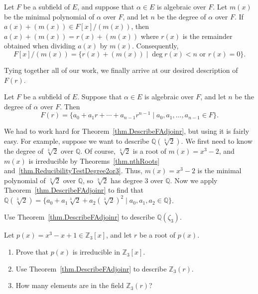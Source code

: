 \begin{lemma}\label{lem.DescribeQuotientWithRemainders}
Let $F$ be a subfield of $E$, and suppose that $\alpha\in E$ is algebraic over $F$. Let $m(x)$ be the minimal polynomial of $\alpha$ over $F$, and let $n$ be the degree of $\alpha$ over $F$.  If $a(x) + (m(x)) \in F[x]/(m(x))$, then $a(x) + (m(x)) =  r(x) + (m(x))$ where $r(x)$ is the remainder obtained when dividing $a(x)$ by $m(x)$. Consequently,
\[F[x]/(m(x)) = \{r(x) +  (m(x)) \mid \deg r(x) < n \text{ or } r(x) = 0\}.\]
\end{lemma}

Tying together all of our work, we finally arrive at our desired description of $F(r)$.

\begin{theorem}\label{thm.DescribeFAdjoinr}
Let $F$ be a subfield of $E$. Suppose that $\alpha\in E$ is algebraic over $F$, and let $n$ be the degree of $\alpha$ over $F$. Then \[F(r) = \{a_0 + a_1r+\cdots+a_{n-1}r^{n-1} \mid a_0,a_1,\ldots,a_{n-1} \in F\}.\]
\end{theorem}

We had to work hard for Theorem~\ref{thm.DescribeFAdjoinr}, but using it is fairly easy. For example, suppose we want to describe $\mathbb{Q}(\sqrt[3]{2})$. We first need to know the degree of $\sqrt[3]{2}$ over $\mathbb{Q}$. Of course, $\sqrt[3]{2}$ is a root of $m(x) = x^3-2$, and $m(x)$ is irreducible by Theorems~\ref{thm.nthRoots} and~\ref{thm.ReducibilityTestDegree2or3}. Thus, $m(x) = x^3-2$ is the minimal polynomial of $\sqrt[3]{2}$ over $\mathbb{Q}$, so $\sqrt[3]{2}$ has degree $3$ over $\mathbb{Q}$. Now we  apply Theorem~\ref{thm.DescribeFAdjoinr} to find that $\mathbb{Q}(\sqrt[3]{2}) = \{a_0 + a_1\sqrt[3]{2}+a_{2}(\sqrt[3]{2})^{2} \mid a_0,a_1,a_2 \in \mathbb{Q}\}$.

\begin{problem}
Use  Theorem~\ref{thm.DescribeFAdjoinr} to describe $\mathbb{Q}(\zeta_3)$.
\end{problem}

\begin{problem} Let $p(x) = x^3-x+1 \in \mathbb{Z}_3[x]$, and let $r$ be a root of $p(x)$. 
\begin{enumerate}
\item Prove that $p(x)$ is irreducible in $\mathbb{Z}_3[x]$. 
\item Use Theorem~\ref{thm.DescribeFAdjoinr} to describe $\mathbb{Z}_3(r)$.
\item How many elements are in the field $\mathbb{Z}_3(r)$?
\end{enumerate}
\end{problem}

